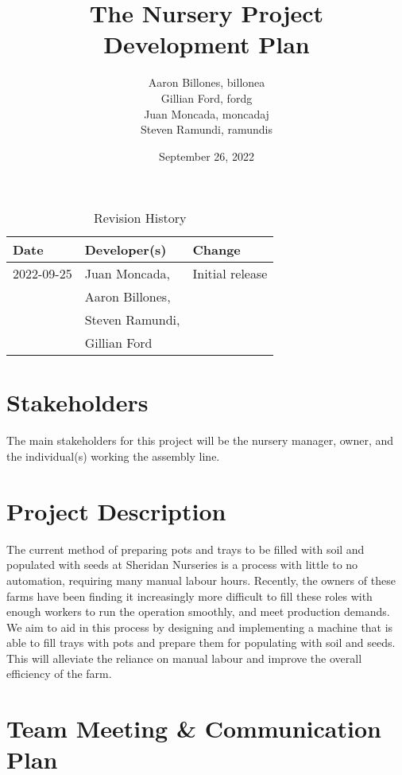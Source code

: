 \documentclass{article}
\title{The Nursery Project\\ Development Plan}
\author{Aaron Billones, billonea\\Gillian Ford, fordg\\Juan Moncada, moncadaj\\Steven Ramundi, ramundis}
\date{September 26, 2022}
\begin{document}
\maketitle

\begin{table}[hp]
	\caption{Revision History} \label{TblRevisionHistory}
	\begin{tabularx}{\textwidth}{llX}
	\toprule
	\textbf{Date} & \textbf{Developer(s)} & \textbf{Change}\\
	\midrule
	2022-09-25 & Juan Moncada,& Initial release\\&Aaron Billones,\\&Steven Ramundi,\\&Gillian Ford \\
	\bottomrule
	\end{tabularx}
	\end{table}

	\newpage
	
	\section{Stakeholders}
	The main stakeholders for this project will be the nursery manager, 
	owner, and the individual(s) working the assembly line.
	
	\section{Project Description} 
	The current method of preparing pots and trays to be filled with soil and populated with seeds at Sheridan Nurseries is a process with little to no automation, requiring many manual labour hours. Recently, the owners of these farms have been finding it increasingly more difficult to fill these roles with enough workers to run the operation smoothly, and meet production demands. We aim to aid in this process by designing and implementing a machine that is able to fill trays with pots and prepare them for populating with soil and seeds. This will alleviate the reliance on manual labour and improve the overall efficiency of the farm.

	\section{Team Meeting \& Communication Plan}
	
\end{document}
